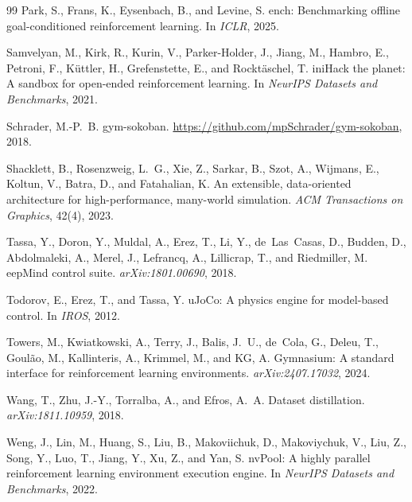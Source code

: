 \documentclass{article}
\begin{document}
\begin{thebibliography}{99}
Park, S., Frans, K., Eysenbach, B., and Levine, S.
ench: Benchmarking offline goal-conditioned reinforcement
  learning.
\newblock In \emph{ICLR}, 2025.

Samvelyan, M., Kirk, R., Kurin, V., Parker-Holder, J., Jiang, M., Hambro, E.,
  Petroni, F., K\"uttler, H., Grefenstette, E., and Rockt\"aschel, T.
ini{H}ack the planet: A sandbox for open-ended reinforcement
  learning.
\newblock In \emph{NeurIPS Datasets and Benchmarks}, 2021.

Schrader, M.-P.~B.
\newblock gym-sokoban.
\newblock \url{https://github.com/mpSchrader/gym-sokoban}, 2018.

Shacklett, B., Rosenzweig, L.~G., Xie, Z., Sarkar, B., Szot, A., Wijmans, E.,
  Koltun, V., Batra, D., and Fatahalian, K.
\newblock An extensible, data-oriented architecture for high-performance,
  many-world simulation.
\newblock \emph{ACM Transactions on Graphics}, 42(4), 2023.

Tassa, Y., Doron, Y., Muldal, A., Erez, T., Li, Y., de~Las~Casas, D., Budden,
  D., Abdolmaleki, A., Merel, J., Lefrancq, A., Lillicrap, T., and Riedmiller,
  M.
eep{M}ind control suite.
\newblock \emph{arXiv:1801.00690}, 2018.

Todorov, E., Erez, T., and Tassa, Y.
u{J}o{C}o: A physics engine for model-based control.
\newblock In \emph{IROS}, 2012.

Towers, M., Kwiatkowski, A., Terry, J., Balis, J.~U., de~Cola, G., Deleu, T.,
  Goul\~ao, M., Kallinteris, A., Krimmel, M., and KG, A.
\newblock Gymnasium: A standard interface for reinforcement learning
  environments.
\newblock \emph{arXiv:2407.17032}, 2024.

Wang, T., Zhu, J.-Y., Torralba, A., and Efros, A.~A.
\newblock Dataset distillation.
\newblock \emph{arXiv:1811.10959}, 2018.

Weng, J., Lin, M., Huang, S., Liu, B., Makoviichuk, D., Makoviychuk, V., Liu,
  Z., Song, Y., Luo, T., Jiang, Y., Xu, Z., and Yan, S.
nv{P}ool: A highly parallel reinforcement learning environment
  execution engine.
\newblock In \emph{NeurIPS Datasets and Benchmarks}, 2022.


\end{thebibliography}
\end{document}
